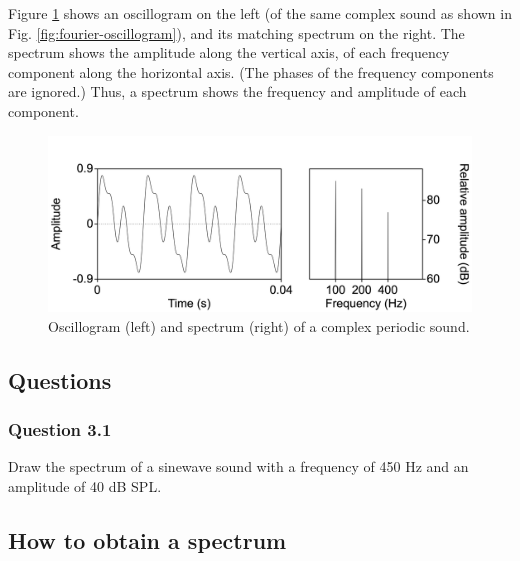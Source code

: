 \documentclass[
]{book}
\begin{document}
Figure \ref{fig:complex100n200n400} shows an oscillogram on the left (of the same complex sound as shown in Fig. \ref{fig:fourier-oscillogram}), and its matching spectrum on the right. The spectrum shows the amplitude along the vertical axis, of each frequency component along the horizontal axis. (The phases of the frequency components are ignored.) Thus, a spectrum shows the frequency and amplitude of each component.

\begin{figure}

{\centering \includegraphics{figures/complex100n200n400} 

}

\caption{Oscillogram (left) and spectrum (right) of a complex periodic sound.}\label{fig:complex100n200n400}
\end{figure}

\label{questions-spectrum}
\subsection*{Questions}\label{questions-2}

\subsubsection*{Question 3.1}\label{question-3.1}

Draw the spectrum of a sinewave sound with a frequency of 450 Hz and an amplitude of 40 dB SPL.

\label{box:praatspectrum}
\subsection{How to obtain a spectrum}\label{how-to-obtain-a-spectrum}
\end{document}
